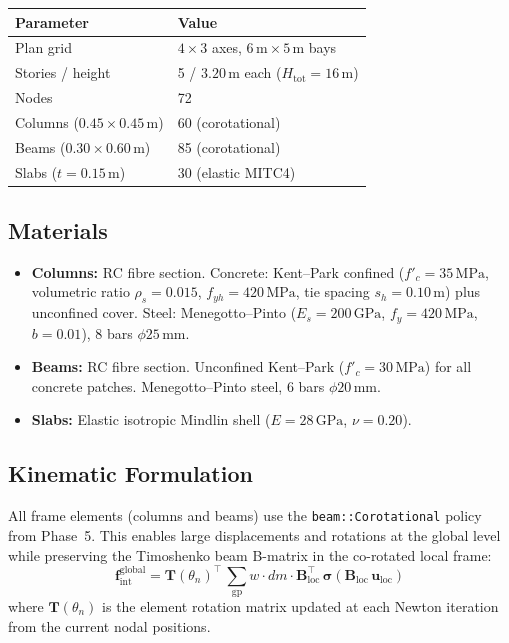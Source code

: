 \begin{center}
\begin{tabular}{ll}
  \toprule
  \textbf{Parameter}             & \textbf{Value} \\
  \midrule
  Plan grid                      & $4 \times 3$ axes, $6\,\text{m} \times 5\,\text{m}$ bays \\
  Stories / height               & 5 / $3.20\,\text{m}$ each ($H_{\text{tot}} = 16\,\text{m}$) \\
  Nodes                          & 72 \\
  Columns ($0.45 \times 0.45\,\text{m}$)  & 60 \quad (corotational) \\
  Beams ($0.30 \times 0.60\,\text{m}$)    & 85 \quad (corotational) \\
  Slabs ($t = 0.15\,\text{m}$)            & 30 \quad (elastic MITC4) \\
  \bottomrule
\end{tabular}
\end{center}

\subsection{Materials}

\begin{itemize}
  \item \textbf{Columns:} RC fibre section. Concrete: Kent--Park confined
        ($f'_c = 35\,\text{MPa}$, volumetric ratio $\rho_s = 0.015$,
        $f_{yh} = 420\,\text{MPa}$, tie spacing $s_h = 0.10\,\text{m}$)
        plus unconfined cover.  Steel: Menegotto--Pinto
        ($E_s = 200\,\text{GPa}$, $f_y = 420\,\text{MPa}$, $b = 0.01$),
        8 bars $\phi 25\,\text{mm}$.

  \item \textbf{Beams:} RC fibre section. Unconfined Kent--Park
        ($f'_c = 30\,\text{MPa}$) for all concrete patches.
        Menegotto--Pinto steel, 6 bars $\phi 20\,\text{mm}$.

  \item \textbf{Slabs:} Elastic isotropic Mindlin shell
        ($E = 28\,\text{GPa}$, $\nu = 0.20$).
\end{itemize}

\subsection{Kinematic Formulation}

All frame elements (columns and beams) use the \texttt{beam::Corotational}
policy from Phase~5.  This enables large displacements and rotations at
the global level while preserving the Timoshenko beam B-matrix in the
co-rotated local frame:
\begin{equation}
  \mathbf{f}_{\text{int}}^{\text{global}}
  = \mathbf{T}(\theta_n)^\top \,
    \sum_{\text{gp}} w \cdot dm \cdot \mathbf{B}_{\text{loc}}^\top \,
    \boldsymbol\sigma(\mathbf{B}_{\text{loc}} \, \mathbf{u}_{\text{loc}})
\end{equation}
where $\mathbf{T}(\theta_n)$ is the element rotation matrix updated at
each Newton iteration from the current nodal positions.

